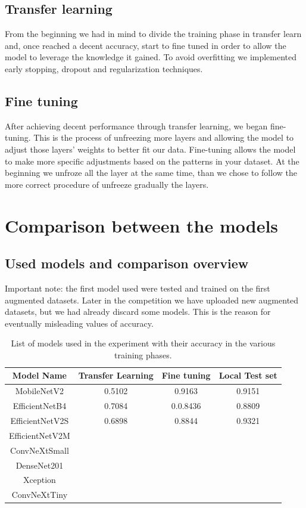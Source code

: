 \documentclass[11pt]{article}
\begin{document}
\subsection{Transfer learning}
From the beginning we had in mind to divide the training phase in transfer learn and, once reached a decent accuracy, start to fine tuned in order to allow the model to leverage the knowledge it gained. To avoid overfitting we implemented early stopping, dropout and regularization techniques.
\subsection{Fine tuning}
 After achieving decent performance through transfer learning, we began fine-tuning. This is the process of unfreezing more layers and allowing the model to adjust those layers' weights to better fit our data. Fine-tuning allows the model to make more specific adjustments based on the patterns in your dataset. At the beginning we unfroze all the layer at the same time, than we chose to follow the more correct procedure of unfreeze gradually the layers.
\section{Comparison between the models}
\subsection{Used models and comparison overview}
Important note: the first model used were tested and trained on the first augmented datasets. Later in the competition we have uploaded new augmented datasets, but we had already discard some models. This is the reason for eventually misleading values of accuracy.
\begin{table}[h!]
\centering

\begin{tabular}{|c|c|c|c|}
\hline
\textbf{Model Name} & \textbf{Transfer Learning} & \textbf{Fine tuning}& \textbf{Local Test set} \\
\hline
MobileNetV2         & 0.5102 & 0.9163 & 0.9151 \\ \hline
EfficientNetB4      & 0.7084 & 0.0.8436 & 0.8809 \\ \hline
EfficientNetV2S     & 0.6898 & 0.8844 & 0.9321 \\ \hline
EfficientNetV2M     &  &  & \\ \hline
ConvNeXtSmall       &  &  & \\ \hline
DenseNet201         &  &  & \\ \hline
Xception            &  &  & \\ \hline
ConvNeXtTiny        &  &  & \\ \hline
\end{tabular}
\caption{List of models used in the experiment with their accuracy in the various training phases.}
\end{table}
\end{document}

